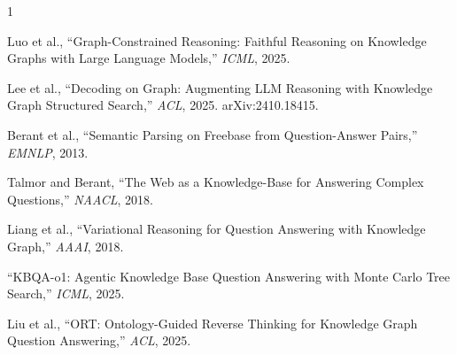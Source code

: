 \documentclass[11pt,a4paper]{article}
\begin{document}
\begin{thebibliography}{1}

  Luo et al., ``Graph-Constrained Reasoning: Faithful Reasoning on
  Knowledge Graphs with Large Language Models,'' \emph{ICML}, 2025.

  Lee et al., ``Decoding on Graph: Augmenting LLM Reasoning with
  Knowledge Graph Structured Search,'' \emph{ACL}, 2025.
  arXiv:2410.18415.

  Berant et al., ``Semantic Parsing on Freebase from Question-Answer
  Pairs,'' \emph{EMNLP}, 2013.

  Talmor and Berant, ``The Web as a Knowledge-Base for Answering
  Complex Questions,'' \emph{NAACL}, 2018.

  Liang et al., ``Variational Reasoning for Question Answering with
  Knowledge Graph,'' \emph{AAAI}, 2018.

  ``KBQA-o1: Agentic Knowledge Base Question Answering with Monte Carlo
  Tree Search,'' \emph{ICML}, 2025.

  Liu et al., ``ORT: Ontology-Guided Reverse Thinking for Knowledge
  Graph Question Answering,'' \emph{ACL}, 2025.

\end{thebibliography}
\end{document}

